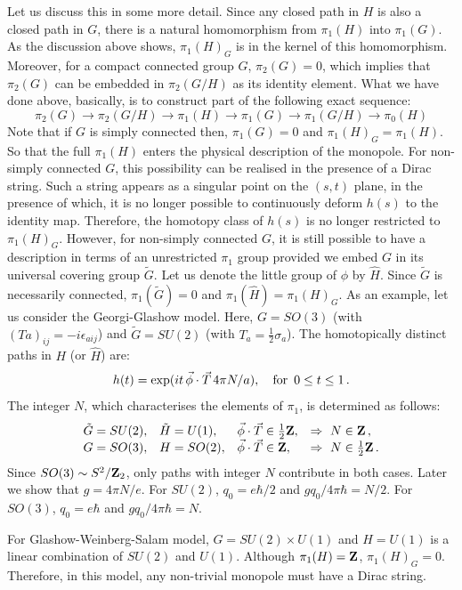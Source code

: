 Let us discuss this in some more detail. Since any closed path in $H$
is also a closed path in $G$, there is a 
natural homomorphism from $\pi_1(H)$ into $\pi_1(G)$. As the
discussion above shows, $\pi_1(H)_G$ is in the kernel of this
homomorphism. Moreover, for a compact connected group $G$,
$\pi_2(G)=0$, which implies that $\pi_2(G)$ can be embedded in
$\pi_2(G/H)$ as its identity element. What we have done above,
basically, is to construct part of the following exact sequence:
$$
\pi_2(G)\rightarrow\pi_2(G/H)\rightarrow\pi_1(H)\rightarrow 
\pi_1(G)\rightarrow\pi_1(G/H)\rightarrow\pi_0(H)
$$
Note that if $G$ is simply connected then, $\pi_1(G)=0$ and 
$\pi_1(H)_G=\pi_1(H)$. So that the full $\pi_1(H)$ enters the physical
description of the monopole. For non-simply connected $G$, this
possibility can be realised in the presence of a Dirac string. Such a
string appears as a singular point on the $(s,t)$ plane, in the
presence of which, it is no longer possible to continuously deform 
$h(s)$ to the identity map. Therefore, the homotopy class of $h(s)$ is
no longer restricted to $\pi_1(H)_G$. However, 
for non-simply connected $G$, it is still possible to have a
description in terms of an unrestricted $\pi_1$ group provided we
embed $G$ in its universal covering group $\tilde G$. Let us denote
the little group of $\phi$ by $\hat H$. Since $\tilde G$ is
necessarily connected, $\pi_1(\tilde G)=0$ and $\pi_1(\hat H)= 
\pi_1(H)_G$. As an example, let us consider the Georgi-Glashow
model. Here, $G = SO(3)$ (with $(Ta)_{ij}=-i\epsilon_{aij}$) and  
$\tilde{G} = SU(2)$ (with $T_a=\frac{1}{2}\sigma_a$). The
homotopically distinct paths in $H$ (or $\hat H$) are: 
$$
h(t)=\exp(it\,\vec{\phi}\cdot\vec{T}\,4\pi N/a),\quad {\rm for}\,\,\, 
0 \leq t \leq 1\,.
$$
The integer $N$, which  characterises the elements of $\pi_1$, is
determined as follows: 
$$
\begin{array}{llll}
\tilde G=SU(2),& \tilde H=U(1),& \vec{\phi}\cdot\vec{T}\in 
\frac{1}{2}{\bf Z},& \Rightarrow\,\, N \in {\bf Z}\,, \cr
G=SO(3),& H=SO(2),& \vec{\phi}\cdot\vec{T}\in {\bf Z},&
\Rightarrow\,\, N \in \frac{1}{2}{\bf Z}\,.
\end{array}
$$
Since $SO(3)\sim S^2/{\bf Z}_2$, only paths with integer $N$
contribute in both cases. Later we show that $g=4\pi N/e$. For $SU(2)$,
$q_0=e\hbar/2$ and $gq_0/4\pi\hbar=N/2$. For $SO(3)$, $q_0=e\hbar$ and
$gq_0/4\pi\hbar=N$.

For Glashow-Weinberg-Salam model, $G=SU(2)\times U(1)$ and $H=U(1)$ is
a linear combination of $SU(2)$ and $U(1)$.  Although $\pi_{1} (H) =
{\bf Z}$, $\pi_{1} (H)_{G} = 0$. Therefore, in this model, any
non-trivial monopole must have a Dirac string.

